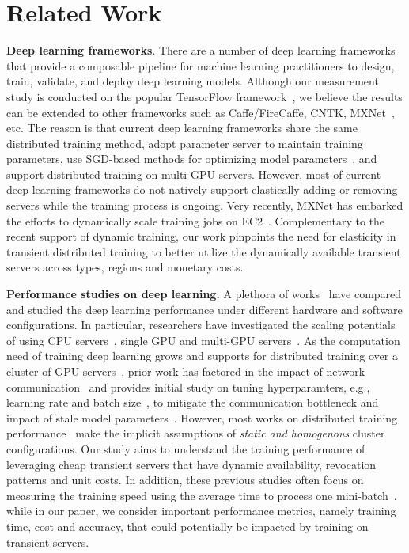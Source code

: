 \section{Related Work}


\textbf{Deep learning frameworks}. There are a number of deep learning frameworks~\cite{caffe2,tensorflow,pytorch,tensor2tensor} that provide a composable pipeline for machine learning practitioners to design, train, validate, and deploy deep learning models. Although our measurement study is conducted on the popular TensorFlow framework~\cite{tensorflow}, we believe the results can be extended to other frameworks such as Caffe/FireCaffe, CNTK, MXNet~\cite{caffe2,cntk,mxnet}, etc. The reason is that current deep learning frameworks share the same distributed training method, adopt parameter server to maintain training parameters, use SGD-based methods for optimizing model parameters~\cite{sgd1,stale4}, and support distributed training on multi-GPU servers. However, most of current deep learning frameworks do not natively support elastically adding or removing servers while the training process is ongoing. Very recently, MXNet has embarked the efforts to dynamically scale training jobs on EC2~\cite{dt_mxnet}. Complementary to the recent support of dynamic training, our work pinpoints the need for elasticity in transient distributed training to better utilize the dynamically available transient servers across types, regions and monetary costs. 


\textbf{Performance studies on deep learning.} 
A plethora of works~\cite{2016cloudandbigdata} have compared and studied the deep learning performance under different hardware and software configurations.  
In particular, researchers have investigated the scaling potentials of using CPU servers~\cite{jeffdean}, single GPU and multi-GPU servers~\cite{shi2018performance}.
As the computation need of training deep learning grows and supports for distributed training over a cluster of GPU servers~\cite{project_adam,firecaffe,geeps}, prior work has factored in the impact of network communication~\cite{lin2017deep, wen2017terngrad, strom2015scalable}
and provides initial study on tuning hyperparamters, e.g., learning rate and batch size~\cite{srinivasan2018analysis,stale4,goyal2017accurate,you2018imagenet,akiba2017extremely}, to mitigate the communication bottleneck and impact of stale model parameters~\cite{stale1,stale2,stale3,stale4}. 
However, most works on distributed training performance~\cite{shi2018performance,dl_perf1,dl_perf2} make the implicit assumptions of \emph{static and homogenous} cluster configurations. Our study aims to understand the training performance of leveraging cheap transient servers that have dynamic availability, revocation patterns and unit costs. In addition, these previous studies often focus on measuring the training speed using the average time to process one mini-batch~\cite{2016cloudandbigdata,shi2018performance,peng2018optimus}. while in our paper, we consider important performance metrics, namely training time, cost and accuracy, that could potentially be impacted by training on transient servers. 

